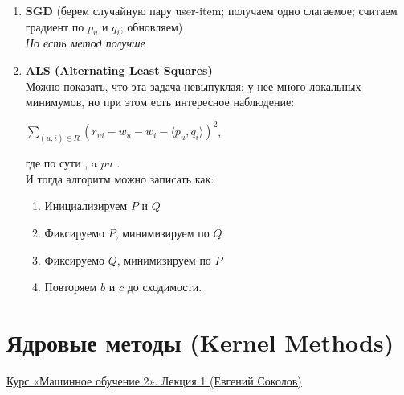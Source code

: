                 \begin{enumerate}
                    \item \textbf{SGD} (берем случайную пару user-item; получаем одно слагаемое; считаем градиент по $p_u$ и $q_i$; обновляем)\\

                    \textit{Но есть метод получше}

                    \item \textbf{ALS (Alternating Least Squares)}\\
                    
                    Можно показать, что эта задача невыпуклая; у нее много локальных минимумов, но при этом есть интересное наблюдение: 
                    \begin{center}
                        \Large
                        $\sum\limits_{(u, i) \in R}(r_{ui} - w_u - w_i - \langle p_u, q_i \rangle)^2$,
                    \end{center}
                    где по сути , a $pu$ .\\

                    И тогда алгоритм можно записать как:
                    \begin{enumerate}
                        \item Инициализируем $P$ и $Q$
                        \item Фиксируемо $P$, минимизируем по $Q$
                        \item Фиксируемо $Q$, минимизируем по $P$
                        \item Повторяем $b$ и $c$ до сходимости.
                    \end{enumerate}
                     
                \end{enumerate}
\newpage            
\section{Ядровые методы (Kernel Methods)} 

    \href{https://www.youtube.com/watch?v=7mnF81f_4FU&list=PLEqoHzpnmTfAVdVl2fH_je2_jWCEPAAqv}{Курс «Машинное обучение 2». Лекция 1 (Евгений Соколов)}

